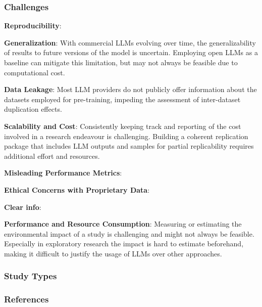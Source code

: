 \subsubsection{Challenges}
\textbf{Reproducibility}:

\textbf{Generalization}:
With commercial LLMs evolving over time, the generalizability of results to future versions of the model is uncertain. Employing open LLMs as a baseline can mitigate this limitation, but may not always be feasible due to computational cost.

\textbf{Data Leakage}:
Most LLM providers do not publicly offer information about the datasets employed for pre-training, impeding the assessment of inter-dataset duplication effects.

\textbf{Scalability and Cost}:
Consistently keeping track and reporting of the cost involved in a research endeavour is challenging.
Building a coherent replication package that includes LLM outputs and samples for partial replicability requires additional effort and resources.

\textbf{Misleading Performance Metrics}:

\textbf{Ethical Concerns with Proprietary Data}:

\textbf{Clear info}:

\textbf{Performance and Resource Consumption}:
Measuring or estimating the environmental impact of a study is challenging and might not always be feasible. Especially in exploratory research the impact is hard to estimate beforehand, making it difficult to justify the usage of LLMs over other approaches.

\subsubsection{Study Types}


\subsubsection{References}





